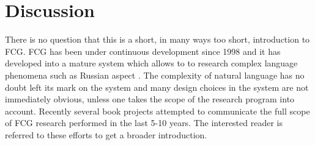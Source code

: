 \section{Discussion}
There is no question that this is a short, in many ways too short,
introduction to FCG. FCG has been under continuous development
since 1998 and it has developed into a mature system which allows to 
to research complex language phenomena such as Russian aspect 
\citep{gerasymova2010acquisition,gerasymova2012temporal}. The complexity of natural 
language has no doubt left its mark on the system and many design 
choices in the system are not immediately obvious,
unless one takes the scope of the research program into account.
Recently several book projects \citep{steels2011design,steels2012computational}
attempted to communicate the full scope of FCG research
performed in the last 5-10 years. The interested reader is referred
to these efforts to get a broader introduction.

%
% 
%


